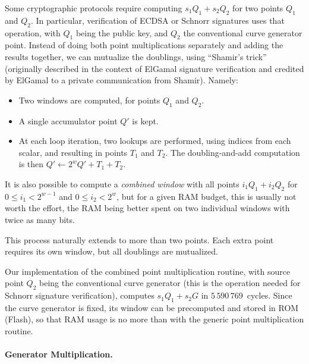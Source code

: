 \documentclass{llncs}
\begin{document}
Some cryptographic protocols require computing $s_1Q_1 + s_2Q_2$ for two
points $Q_1$ and $Q_2$. In particular, verification of ECDSA or Schnorr
signatures uses that operation, with $Q_1$ being the public key, and
$Q_2$ the conventional curve generator point. Instead of doing both
point multiplications separately and adding the results together, we can
mutualize the doublings, using ``Shamir's trick'' (originally described
in the context of ElGamal signature verification and credited by ElGamal
to a private communication from Shamir\cite{ElG1988}). Namely:
\begin{itemize}

    \item Two windows are computed, for points $Q_1$ and $Q_2$.

    \item A single accumulator point $Q'$ is kept.

    \item At each loop iteration, two lookups are performed, using
    indices from each scalar, and resulting in points $T_1$ and $T_2$.
    The doubling-and-add computation is then
    $Q' \gets 2^w Q' + T_1 + T_2$.

\end{itemize}

It is also possible to compute a \emph{combined window} with all points
$i_1 Q_1 + i_2 Q_2$ for $0\leq i_1 < 2^{w-1}$ and $0\leq i_2 < 2^w$, but
for a given RAM budget, this is usually not worth the effort, the RAM
being better spent on two individual windows with twice as many bits.

This process naturally extends to more than two points. Each extra point
requires its own window, but all doublings are mutualized.

Our implementation of the combined point multiplication routine, with
source point $Q_2$ being the conventional curve generator (this is the
operation needed for Schnorr signature verification), computes $s_1 Q_1
+ s_2 G$ in $5\,590\,769$~cycles. Since the curve generator is fixed,
its window can be precomputed and stored in ROM (Flash), so that RAM
usage is no more than with the generic point multiplication routine.

\paragraph{Generator Multiplication.}
\end{document}
